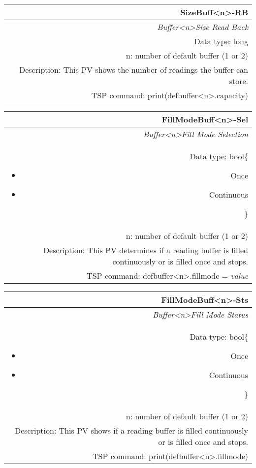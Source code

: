 \documentclass[openany]{article}
\begin{document}
		\begin{tabular}{N}
			\hline
			\bfseries SizeBuff\textless n\textgreater-RB\label{pv:sizebuff-rb} \\ \hline
			\emph{Buffer\textless n\textgreater Size Read Back} \\
			Data type: long \\
			n: number of default buffer (1 or 2) \\
			Description: This PV shows the number of readings the buffer can store. \\
			TSP command: print(defbuffer\textless n\textgreater.capacity)
		\end{tabular}

		\begin{tabular}{N}
			\hline
			\bfseries FillModeBuff\textless n\textgreater-Sel\label{pv:fillmodebuff-sel} \\ \hline
			\emph{Buffer\textless n\textgreater Fill Mode Selection} \\
			Data type: bool\{\begin{itemize}[noitemsep]
				\small
				\item[] Once
				\item[] Continuous
			\end{itemize}\} \\
			n: number of default buffer (1 or 2) \\
			Description: This PV determines if a reading buffer is filled continuously or is filled once and stops. \\
			TSP command: defbuffer\textless n\textgreater.fillmode = \emph{value}
		\end{tabular}

		\begin{tabular}{N}
			\hline
			\bfseries FillModeBuff\textless n\textgreater-Sts\label{pv:fillmodebuff-sts} \\ \hline
			\emph{Buffer\textless n\textgreater Fill Mode Status} \\
			Data type: bool\{\begin{itemize}[noitemsep]
				\small
				\item[] Once
				\item[] Continuous
			\end{itemize}\} \\
			n: number of default buffer (1 or 2) \\
			Description: This PV shows if a reading buffer is filled continuously or is filled once and stops. \\
			TSP command: print(defbuffer\textless n\textgreater.fillmode)
		\end{tabular}
\end{document}
